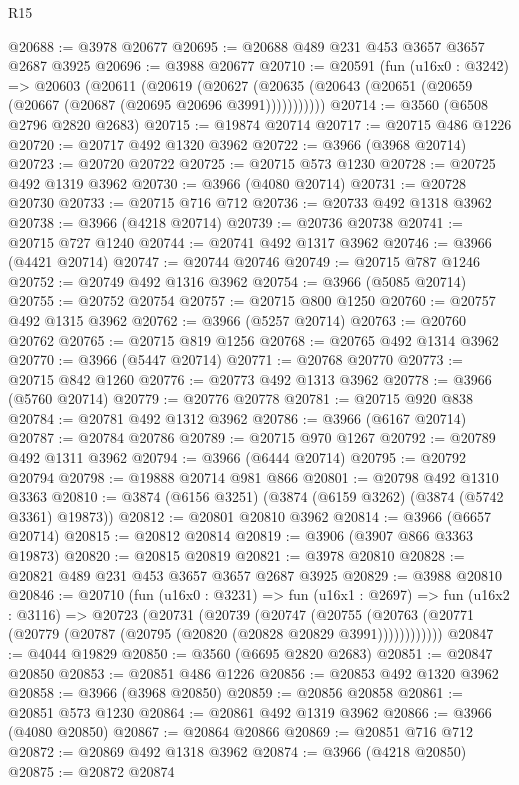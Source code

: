 \begin{lexlean}{R15}
\begin{coremodule}
@20688 := @3978 @20677
@20695 := @20688 @489 @231 @453 @3657 @3657 @2687 @3925
@20696 := @3988 @20677
@20710 := @20591
    (fun (u16x0 : @3242) =>
    @20603
      (@20611
        (@20619
          (@20627 (@20635 (@20643 (@20651 (@20659 (@20667 (@20687 (@20695 @20696 @3991)))))))))))
@20714 := @3560 (@6508 @2796 @2820 @2683)
@20715 := @19874 @20714
@20717 := @20715 @486 @1226
@20720 := @20717 @492 @1320 @3962
@20722 := @3966 (@3968 @20714)
@20723 := @20720 @20722
@20725 := @20715 @573 @1230
@20728 := @20725 @492 @1319 @3962
@20730 := @3966 (@4080 @20714)
@20731 := @20728 @20730
@20733 := @20715 @716 @712
@20736 := @20733 @492 @1318 @3962
@20738 := @3966 (@4218 @20714)
@20739 := @20736 @20738
@20741 := @20715 @727 @1240
@20744 := @20741 @492 @1317 @3962
@20746 := @3966 (@4421 @20714)
@20747 := @20744 @20746
@20749 := @20715 @787 @1246
@20752 := @20749 @492 @1316 @3962
@20754 := @3966 (@5085 @20714)
@20755 := @20752 @20754
@20757 := @20715 @800 @1250
@20760 := @20757 @492 @1315 @3962
@20762 := @3966 (@5257 @20714)
@20763 := @20760 @20762
@20765 := @20715 @819 @1256
@20768 := @20765 @492 @1314 @3962
@20770 := @3966 (@5447 @20714)
@20771 := @20768 @20770
@20773 := @20715 @842 @1260
@20776 := @20773 @492 @1313 @3962
@20778 := @3966 (@5760 @20714)
@20779 := @20776 @20778
@20781 := @20715 @920 @838
@20784 := @20781 @492 @1312 @3962
@20786 := @3966 (@6167 @20714)
@20787 := @20784 @20786
@20789 := @20715 @970 @1267
@20792 := @20789 @492 @1311 @3962
@20794 := @3966 (@6444 @20714)
@20795 := @20792 @20794
@20798 := @19888 @20714 @981 @866
@20801 := @20798 @492 @1310 @3363
@20810 := @3874 (@6156 @3251) (@3874 (@6159 @3262) (@3874 (@5742 @3361) @19873))
@20812 := @20801 @20810 @3962
@20814 := @3966 (@6657 @20714)
@20815 := @20812 @20814
@20819 := @3906 (@3907 @866 @3363 @19873)
@20820 := @20815 @20819
@20821 := @3978 @20810
@20828 := @20821 @489 @231 @453 @3657 @3657 @2687 @3925
@20829 := @3988 @20810
@20846 := @20710
    (fun (u16x0 : @3231) =>
    fun (u16x1 : @2697) =>
    fun (u16x2 : @3116) =>
    @20723
      (@20731
        (@20739
          (@20747
            (@20755 (@20763 (@20771 (@20779 (@20787 (@20795 (@20820 (@20828 @20829 @3991))))))))))))
@20847 := @4044 @19829
@20850 := @3560 (@6695 @2820 @2683)
@20851 := @20847 @20850
@20853 := @20851 @486 @1226
@20856 := @20853 @492 @1320 @3962
@20858 := @3966 (@3968 @20850)
@20859 := @20856 @20858
@20861 := @20851 @573 @1230
@20864 := @20861 @492 @1319 @3962
@20866 := @3966 (@4080 @20850)
@20867 := @20864 @20866
@20869 := @20851 @716 @712
@20872 := @20869 @492 @1318 @3962
@20874 := @3966 (@4218 @20850)
@20875 := @20872 @20874

\end{coremodule}
\end{lexlean}
